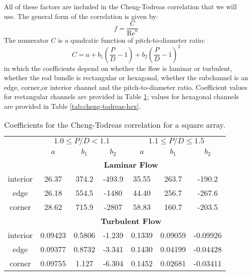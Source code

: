 All of these factors are included in the Cheng-Todreas correlation\cite{cheng1986hydrodynamic} that we will use.  The general form of the correlation is given by:
$$f = \frac{C}{\text{Re}^n}$$
The numerator $C$ is a quadratic function of pitch-to-diameter ratio:
$$C = a + b_1\left(\frac{P}{D}-1\right)+b_2\left(\frac{P}{D}-1\right)^2$$
in which the coefficients depend on whether the flow is laminar or turbulent, whether the rod bundle is rectangular or hexagonal, whether the subchannel is an edge, corner,or interior channel and the pitch-to-diameter ratio.  Coefficient values for rectangular channels are provided in Table \ref{tab:cheng-todreas-sq}; values for hexagonal channels are provided in Table \ref{tab:cheng-todreas-hex}.
\begin{table}
\begin{tabular}{c c c c c c c}
\toprule
  & \multicolumn{3}{c}{$1.0 \le P/D < 1.1$} & \multicolumn{3}{c}{$1.1 \le P/D \le 1.5$} \\
  \cmidrule(lr){2-4} \cmidrule(lr){5-7}
 & $a$ & $b_1$ & $b_2$ & $a$ & $b_1$ & $b_2$ \\
  & \multicolumn{6}{c}{\textbf{Laminar Flow}} \\
interior  & 26.37 & 374.2 & -493.9 & 35.55 & 263.7 & -190.2 \\
edge      & 26.18 & 554.5 & -1480 & 44.40 & 256.7 & -267.6 \\
corner    & 28.62 & 715.9 & -2807 & 58.83 & 160.7 & -203.5 \\
& \multicolumn{6}{c}{\textbf{Turbulent Flow}} \\
interior & 0.09423 & 0.5806 & -1.239 & 0.1339 & 0.09059 & -0.09926 \\
edge     & 0.09377 & 0.8732 & -3.341 & 0.1430 & 0.04199 & -0.04428 \\
corner   & 0.09755 & 1.127 & -6.304 & 0.1452 & 0.02681 & -0.03411 \\
\bottomrule
\end{tabular}
\caption{Coefficients for the Cheng-Todreas correlation for a square array.}
\label{tab:cheng-todreas-sq}
\end{table}
